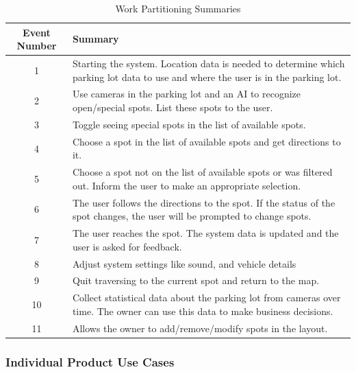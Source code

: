 \documentclass[12pt,letterpaper]{article}
\begin{document}
\begin{table}[h]
\caption{Work Partitioning Summaries}
    \centering
    \begin{tabular}{|c|p{10cm}|}
    \hline
    \textbf{Event Number} & \textbf{Summary} \\
    \hline
    1 & Starting the system. Location data is needed to determine which parking
    lot data to use and where the user is in the parking lot.\\
    \hline
    2 & Use cameras in the parking lot and an AI to recognize open/special
    spots. List these spots to the user.\\
    \hline
    3 & Toggle seeing special spots in the list of available spots.\\
    \hline
    4 & Choose a spot in the list of available spots and get directions to it.\\
    \hline
    5 & Choose a spot not on the list of available spots or was filtered out.
    Inform the user to make an appropriate selection.\\
    \hline
    6 & The user follows the directions to the spot. If the status of the spot
    changes, the user will be prompted to change spots.\\
    \hline
    7 & The user reaches the spot. The system data is updated and the user is
    asked for feedback.\\
    \hline
    8 & Adjust system settings like sound, and vehicle details\\
    \hline
    9 & Quit traversing to the current spot and return to the map.\\
    \hline
    10 & Collect statistical data about the parking lot from cameras over time.
    The owner can use this data to make business decisions.\\
    \hline
    11 & Allows the owner to add/remove/modify spots in the layout.\\
    \hline
    \end{tabular}
\end{table}

\newpage
\subsubsection{Individual Product Use Cases}
\end{document}
